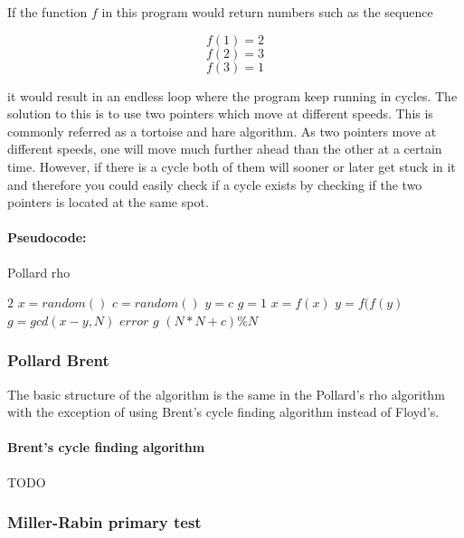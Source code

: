 If the function \(f\) in this program would return numbers such as the sequence

\[f(1) = 2\] 
\[f(2) = 3\] 
\[f(3) = 1\]

it would result in an endless loop where the program keep running in cycles. The solution to this is to use two pointers which move at different speeds. This is commonly referred as a tortoise and hare algorithm. 
As two pointers move at different speeds, one will move much further ahead than the other at a certain time. However, if there is a cycle both of them will sooner or later get stuck in it and therefore you could easily check if a cycle exists by checking if the two pointers is located at the same spot.

\paragraph{Pseudocode:}

\textcolor{white}{ }

\begin{algorithm}[H]
\caption{Pollard rho}
\begin{algorithmic}
	 	\State \Return $2$
	\EndIf
	\State $x = random()$
	\State $c = random()$
	\State $y = c$
	\State $g = 1$
		\State $x = f(x)$
		\State $y = f(f(y)$
		\State $g = gcd(x-y,N)$
	\EndWhile
		\State \Return $error$
	\EndIf
	\State \Return $g$
\EndFunction
{}
	\State \Return $(N*N + c) \% N$
\EndFunction
\end{algorithmic}
\end{algorithm}

\subsubsection{Pollard Brent}

The basic structure of the algorithm is the same in the Pollard's rho algorithm with the exception of using Brent's cycle finding algorithm instead of Floyd's. 

\paragraph{Brent's cycle finding algorithm\\}

TODO

\subsubsection{Miller-Rabin primary test}


